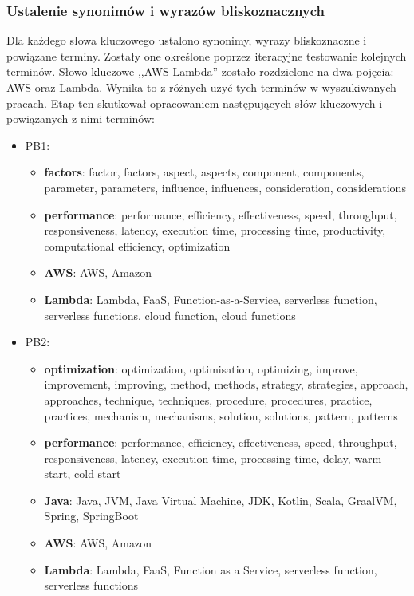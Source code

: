 \subsubsection*{Ustalenie synonimów i wyrazów bliskoznacznych}

Dla każdego słowa kluczowego ustalono synonimy, wyrazy bliskoznaczne i powiązane terminy. 
Zostały one określone poprzez iteracyjne testowanie kolejnych terminów.
Słowo kluczowe ,,AWS Lambda'' zostało rozdzielone na dwa pojęcia: AWS oraz Lambda.
Wynika to z różnych użyć tych terminów w wyszukiwanych pracach.
Etap ten skutkował opracowaniem następujących słów kluczowych i powiązanych z nimi terminów:

\begin{itemize}
    \item PB1:
    \begin{itemize}
        \item \textbf{factors}: factor, factors, aspect, aspects, component, components, parameter, parameters, influence, influences, consideration, considerations
        \item \textbf{performance}: performance, efficiency, effectiveness, speed, throughput, responsiveness, latency, execution time, processing time, productivity, computational efficiency, optimization
        \item \textbf{AWS}: AWS, Amazon
        \item \textbf{Lambda}: Lambda, FaaS, Function-as-a-Service, serverless function, serverless functions, cloud function, cloud functions
    \end{itemize}
    \item PB2:
    \begin{itemize}
        \item \textbf{optimization}: optimization, optimisation, optimizing, improve, improvement, improving, method, methods, strategy, strategies, approach, approaches, technique, techniques, procedure, procedures, practice, practices, mechanism, mechanisms, solution, solutions, pattern, patterns
        \item \textbf{performance}: performance, efficiency, effectiveness, speed, throughput, responsiveness, latency, execution time, processing time, delay, warm start, cold start
        \item \textbf{Java}: Java, JVM, Java Virtual Machine, JDK, Kotlin, Scala, GraalVM, Spring, SpringBoot
        \item \textbf{AWS}: AWS, Amazon
        \item \textbf{Lambda}: Lambda, FaaS, Function as a Service, serverless function, serverless functions

\end{itemize}
\end{itemize}
